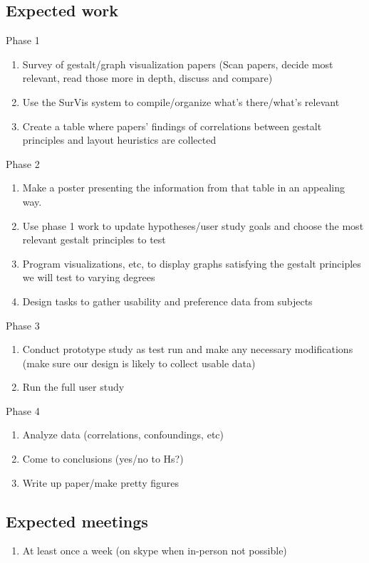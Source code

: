 \documentclass[12pt, twocolumn]{article}
\begin{document}
\subsection{Expected work}
Phase 1
\begin{enumerate}
	\item Survey of gestalt/graph visualization papers (Scan papers, decide most relevant, read those more in depth, discuss and compare)
	\item Use the SurVis system to compile/organize what's there/what's relevant
	\item Create a table where papers' findings of correlations between gestalt principles and layout heuristics are collected
\end{enumerate}
Phase 2
\begin{enumerate}
	\item Make a poster presenting the information from that table in an appealing way.
	\item Use phase 1 work to update hypotheses/user study goals and choose the most relevant gestalt principles to test
	\item Program visualizations, etc, to display graphs satisfying the gestalt principles we will test to varying degrees
	\item Design tasks to gather usability and preference data from subjects
\end{enumerate}
\newpage
Phase 3
\begin{enumerate}
	\item Conduct prototype study as test run and make any necessary modifications (make sure our design is likely to collect usable data)
	\item Run the full user study
\end{enumerate}
Phase 4
\begin{enumerate}
	\item Analyze data (correlations, confoundings, etc)
	\item Come to conclusions (yes/no to Hs?)
	\item Write up paper/make pretty figures
\end{enumerate}
\subsection{Expected meetings}
\begin{enumerate}
	\item At least once a week (on skype when in-person not possible)
\end{enumerate}
\end{document}
